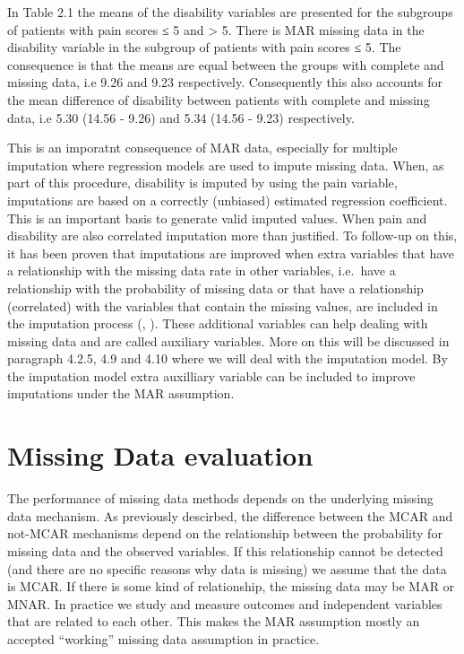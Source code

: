 \documentclass[
]{book}
\begin{document}
In Table 2.1 the means of the disability variables are presented for the subgroups of patients with pain scores ≤ 5 and \textgreater{} 5. There is MAR missing data in the disability variable in the subgroup of patients with pain scores ≤ 5. The consequence is that the means are equal between the groups with complete and missing data, i.e 9.26 and 9.23 respectively. Consequently this also accounts for the mean difference of disability between patients with complete and missing data, i.e 5.30 (14.56 - 9.26) and 5.34 (14.56 - 9.23) respectively.

This is an imporatnt consequence of MAR data, especially for multiple imputation where regression models are used to impute missing data. When, as part of this procedure, disability is imputed by using the pain variable, imputations are based on a correctly (unbiased) estimated regression coefficient. This is an important basis to generate valid imputed values. When pain and disability are also correlated imputation more than justified. To follow-up on this, it has been proven that imputations are improved when extra variables that have a relationship with the missing data rate in other variables, i.e.~have a relationship with the probability of missing data or that have a relationship (correlated) with the variables that contain the missing values, are included in the imputation process (\citet{Collins2001}, \citet{Baraldi2010}). These additional variables can help dealing with missing data and are called auxiliary variables. More on this will be discussed in paragraph 4.2.5, 4.9 and 4.10 where we will deal with the imputation model. By the imputation model extra auxilliary variable can be included to improve imputations under the MAR assumption.

\hypertarget{missing-data-evaluation-1}{%
\section{Missing Data evaluation}\label{missing-data-evaluation-1}}

The performance of missing data methods depends on the underlying missing data mechanism. As previously descirbed, the difference between the MCAR and not-MCAR mechanisms depend on the relationship between the probability for missing data and the observed variables. If this relationship cannot be detected (and there are no specific reasons why data is missing) we assume that the data is MCAR. If there is some kind of relationship, the missing data may be MAR or MNAR. In practice we study and measure outcomes and independent variables that are related to each other. This makes the MAR assumption mostly an accepted ``working'' missing data assumption in practice.
\end{document}
